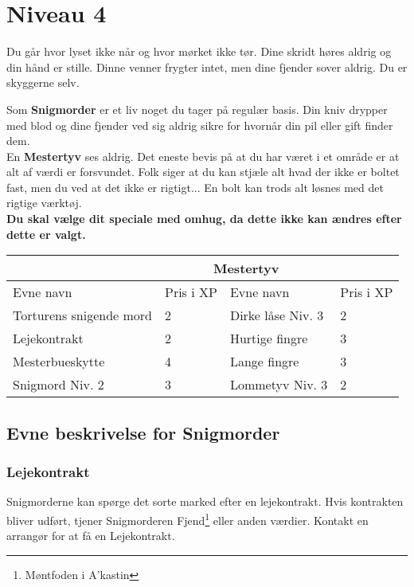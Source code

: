 \chapter{Niveau 4}

Du går hvor lyset ikke når og hvor mørket ikke tør. Dine skridt høres aldrig og din hånd er stille. Dinne venner frygter intet, men dine fjender sover aldrig. Du er skyggerne selv.


Som \textbf{Snigmorder} er et liv noget du tager på regulær basis. Din kniv drypper med blod og dine fjender ved sig aldrig sikre for hvornår din pil eller gift finder dem.\\

En \textbf{Mestertyv} ses aldrig. Det eneste bevis på at du har været i et område er at alt af værdi er forsvundet. Folk siger at du kan stjæle alt hvad der ikke er boltet fast, men du ved at det ikke er rigtigt... En bolt kan trods alt løsnes med det rigtige værktøj.\\

\textbf{Du skal vælge dit speciale med omhug, da dette ikke kan ændres efter dette er valgt.}\\

\begin{tabular}{|p{}|p{}|p{}|p{}|}
\hline
\rowcolor{cerulean!80}
 \multicolumn{2}{|c|}{  Snigmorder } & \multicolumn{2}{|c|}{ Mestertyv }\\
\hline
\rowcolor{cerulean!40}
    Evne navn & Pris i XP & Evne navn & Pris i XP\\ \hline
    Torturens snigende mord & 2 & Dirke låse Niv. 3 & 2 \\ \hline
    Lejekontrakt & 2 & Hurtige fingre & 3\\\hline
    Mesterbueskytte & 4 & Lange fingre & 3\\\hline
    Snigmord Niv. 2 & 3 & Lommetyv Niv. 3 & 2\\
\hline
\end{tabular}

\section{Evne beskrivelse for Snigmorder}

\subsection{Lejekontrakt}
Snigmorderne kan spørge det sorte marked efter en lejekontrakt. Hvis kontrakten
bliver udført, tjener Snigmorderen Fjend\footnote{Møntfoden i A'kastin} eller anden værdier. Kontakt en arrangør for at få en Lejekontrakt.\\

